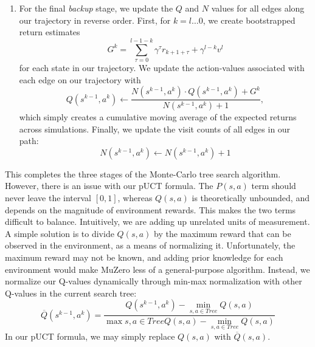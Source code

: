 \begin{enumerate}
    \item For the final \textit{backup} stage, we update the $Q$ and $N$ values for all edges along our trajectory in reverse order. First, for $k = l \dots 0$, we create bootstrapped return estimates
    \begin{equation*}
        G^k = \sum_{\tau=0}^{l - 1 - k} \gamma^\tau r_{k+1+\tau} + \gamma^{l - k} v^l
    \end{equation*}
    for each state in our trajectory. We update the action-values associated with each edge on our trajectory with
    \begin{equation*}
        Q \left(s^{k-1}, a^k\right) \leftarrow \frac{
            N \left(s^{k-1}, a^k \right) \cdot Q \left(s^{k-1}, a^k \right) + G^k
        }{
            N \left(s^{k-1}, a^k \right) + 1
        },
    \end{equation*}
    which simply creates a cumulative moving average of the expected returns across simulations. Finally, we update the visit counts of all edges in our path:
    \begin{equation*}
        N \left(s^{k-1}, a^k \right) \leftarrow  N \left(s^{k-1}, a^k \right) + 1
    \end{equation*}
    \vspace{0.2cm}
\end{enumerate}

This completes the three stages of the Monte-Carlo tree search algorithm. However, there is an issue with our pUCT formula. The $P(s, a)$ term should never leave the interval $[0, 1]$, whereas $Q(s, a)$ is theoretically unbounded, and depends on the magnitude of environment rewards. This makes the two terms difficult to balance. Intuitively, we are adding up unrelated units of measurement. A simple solution is to divide $Q(s, a)$ by the maximum reward that can be observed in the environment, as a means of normalizing it. Unfortunately, the maximum reward may not be known, and adding prior knowledge for each environment would make MuZero less of a general-purpose algorithm. Instead, we normalize our Q-values dynamically through min-max normalization with other Q-values in the current search tree:
\begin{equation*}
    \overline{Q} \left(s^{k-1}, a^k\right) = \frac{
        Q \left(s^{k-1}, a^k\right) - \min_{s, a \in Tree} Q(s, a)
    }{
        \max{s, a \in Tree} Q(s, a) - \min_{s, a \in Tree} Q(s, a)
    }
\end{equation*}
In our pUCT formula, we may simply replace $Q(s, a)$ with $\overline{Q}(s, a)$.

